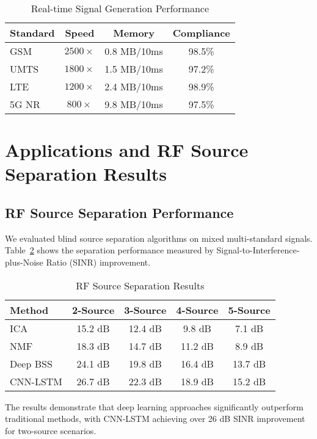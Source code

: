 \documentclass[twocolumn,10pt]{article}
\begin{document}
\begin{table}[h!]
\renewcommand{\arraystretch}{1.3}
\caption{Real-time Signal Generation Performance}
\label{tab:performance}
\centering
\begin{tabular}{lccc}
\toprule
\textbf{Standard} & \textbf{Speed} & \textbf{Memory} & \textbf{Compliance} \\
\midrule
GSM & $2500\times$ & 0.8 MB/10ms & 98.5\% \\
UMTS & $1800\times$ & 1.5 MB/10ms & 97.2\% \\
LTE & $1200\times$ & 2.4 MB/10ms & 98.9\% \\
5G NR & $800\times$ & 9.8 MB/10ms & 97.5\% \\
\bottomrule
\end{tabular}
\end{table}

\section{Applications and RF Source Separation Results}

\subsection{RF Source Separation Performance}

We evaluated blind source separation algorithms on mixed multi-standard signals. Table~\ref{tab:separation_results} shows the separation performance measured by Signal-to-Interference-plus-Noise Ratio (SINR) improvement.

\begin{table}[h!]
\renewcommand{\arraystretch}{1.3}
\caption{RF Source Separation Results}
\label{tab:separation_results}
\centering
\begin{tabular}{lcccc}
\toprule
\textbf{Method} & \textbf{2-Source} & \textbf{3-Source} & \textbf{4-Source} & \textbf{5-Source} \\
\midrule
ICA & 15.2 dB & 12.4 dB & 9.8 dB & 7.1 dB \\
NMF & 18.3 dB & 14.7 dB & 11.2 dB & 8.9 dB \\
Deep BSS & 24.1 dB & 19.8 dB & 16.4 dB & 13.7 dB \\
CNN-LSTM & 26.7 dB & 22.3 dB & 18.9 dB & 15.2 dB \\
\bottomrule
\end{tabular}
\end{table}

The results demonstrate that deep learning approaches significantly outperform traditional methods, with CNN-LSTM achieving over 26 dB SINR improvement for two-source scenarios.
\end{document}
